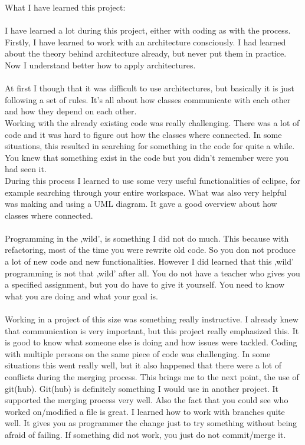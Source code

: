 \documentclass{article}
\begin{document}
\begin{enumerate}
\begin{itemize}
What I have learned this project:\\
\\
I have learned a lot during this project, either with coding as with the process. \\
Firstly, I have learned to work with an architecture consciously. I had learned about the theory behind 
architecture already, but never put them in practice. Now I understand better how to apply architectures. \\
\\
At first I though that it was difficult to use architectures, but basically it is just following a set of rules. It’s all about how classes communicate with each other and how they depend on each other. \\
Working with the already existing code was really challenging. There was a lot of code and it was hard to figure out how the classes where connected. In some situations, this resulted in searching for something in the code for quite a while. You knew that something exist in the code but you didn’t remember were you had seen it. \\
During this process I learned to use some very useful functionalities of eclipse, for example searching through your entire workspace. What was also very helpful was making and using a UML diagram. It gave a good overview about how classes where connected. \\
\\
Programming in the ‚wild’, is something I did not do much. This because with refactoring, most of the time you 
were rewrite old code. So you don not produce a lot of new code and new functionalities. However I did learned that this ‚wild’ programming is not that ‚wild’ after all. You do not have a teacher who gives you a specified assignment, but you do have to give it yourself. You need to know what you are doing and what your goal is. \\
\\
Working in a project of this size was something really instructive. I already knew that communication is very 
important, but this project really emphasized this. It is good to know what someone else is doing and how issues were tackled. Coding with multiple persons on the same piece of code was challenging. In some situations this went really well, but it also happened that there were a lot of conflicts during the merging process. This brings me to the next point, the use of git(hub). Git(hub) is definitely something I would use in another project. It supported the merging process very well. Also the fact that you could see who worked on/modified a file is great. I learned how to work with branches quite well. It gives you as programmer the change just to try something without being afraid of failing. If something did not work, you just do not commit/merge it.\\

\end{itemize}
\end{enumerate}
\end{document}
